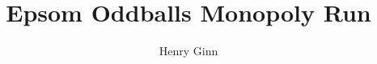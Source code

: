 

\StyleDark


\title{Epsom Oddballs Monopoly Run}
\author{Henry Ginn}



\maketitle

\tableofcontents


\newpage
\newpage
\newpage
\newpage
\newpage
\appendix
\newpage

\printbibliography[title={References}, heading={bibintoc}]

